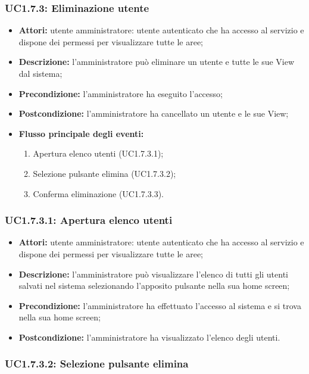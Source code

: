 \subsubsection{UC1.7.3: Eliminazione utente}

\begin{itemize}
    \item \textbf{Attori:} utente amministratore: utente autenticato che ha accesso al servizio e dispone dei permessi per visualizzare tutte le aree;
    \item \textbf{Descrizione:} l'amministratore può eliminare un utente e tutte le sue View dal sistema;
    \item \textbf{Precondizione:} l'amministratore ha eseguito l'accesso;
    \item \textbf{Postcondizione:} l'amministratore ha cancellato un utente e le sue View;
    \item \textbf{Flusso principale degli eventi:}
    \begin{enumerate}
        \item Apertura elenco utenti (UC1.7.3.1);
        \item Selezione pulsante elimina (UC1.7.3.2);
        \item Conferma eliminazione (UC1.7.3.3).
    \end{enumerate}
\end{itemize}

\subsubsection{UC1.7.3.1: Apertura elenco utenti}

\begin{itemize}
    \item \textbf{Attori:} utente amministratore: utente autenticato che ha accesso al servizio e dispone dei permessi per visualizzare tutte le aree;
    \item \textbf{Descrizione:} l'amministratore può visualizzare l'elenco di tutti gli utenti salvati nel sistema selezionando l'apposito pulsante nella sua home screen;
    \item \textbf{Precondizione:} l'amministratore ha effettuato l'accesso al sistema e si trova nella sua home screen;
    \item \textbf{Postcondizione:} l'amministratore ha visualizzato l'elenco degli utenti.
\end{itemize}

\subsubsection{UC1.7.3.2: Selezione pulsante elimina}

